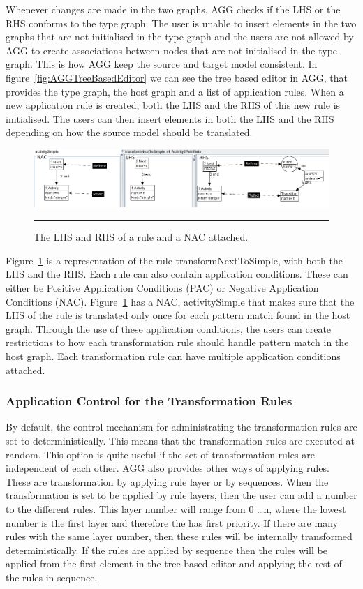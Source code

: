 Whenever changes are made in the two graphs, AGG checks if the LHS or the RHS
conforms to the type graph. The user is unable to insert elements in the two
graphs that are not initialised in the type graph and the users are not allowed
by AGG to create associations between nodes that are not initialised in the type
graph. This is how AGG keep the source and target model consistent. In
figure~\ref{fig:AGGTreeBasedEditor} we can see the tree based editor in AGG,
that provides the type graph, the host graph and a list of application rules.
When a new application rule is created, both the LHS and the RHS of this new
rule is initialised. The users can then insert elements in both the LHS and the
RHS depending on how the source model should be translated. 

\begin{figure}[H]
	\centering
	\includegraphics[scale=0.5]{figures/LHSvsRHSAGG.png}
	\rule{35em}{0.5pt}
	\caption[Representation of a rule in AGG]
	{The LHS and RHS of a rule and a NAC attached.}
	\label{fig:LHSvsRHSAGG}
\end{figure}

Figure~\ref{fig:LHSvsRHSAGG} is a representation of the rule
transformNextToSimple, with both the LHS and the RHS. Each rule can also
contain application conditions. These can either be Positive Application
Conditions (PAC) or Negative Application Conditions (NAC).
Figure~\ref{fig:LHSvsRHSAGG} has a NAC, activitySimple that makes sure that the
LHS of the rule is translated only once for each pattern match found in the
host graph. Through the use of these application conditions, the users can
create restrictions to how each transformation rule should handle pattern match
in the host graph. Each transformation rule can have multiple application
conditions attached.

\subsubsection*{Application Control for the Transformation Rules}

By default, the control mechanism for administrating the transformation rules
are set to deterministically. This means that the transformation rules are
executed at random. This option is quite useful if the set of transformation
rules are independent of each other. AGG also provides other ways of applying
rules. These are transformation by applying rule layer or by sequences. When the
transformation is set to be applied by rule layers, then the user can add a
number to the different rules. This layer number will range from 0 \ldots n,
where the lowest number is the first layer and therefore the has first
priority. If there are many rules with the same layer number, then these rules
will be internally transformed deterministically. If the rules are applied
by sequence then the rules will be applied from the first element in the tree
based editor and applying the rest of the rules in sequence.

